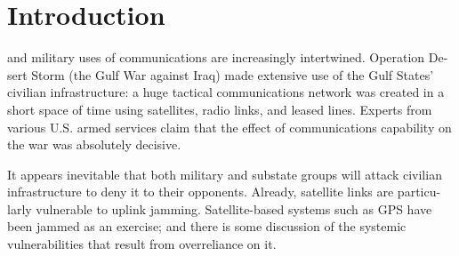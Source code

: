 \documentclass[10pt,journal,compsoc]{IEEEtran}
\begin{document}
\ifCLASSOPTIONcompsoc
{}
\else
\section{Introduction}
\label{sec:introduction}
\fi




%
%
%
%
 and military uses of communications are increasingly intertwined. Operation De-
sert Storm (the Gulf War against Iraq) made extensive use of the Gulf States’ civilian
infrastructure: a huge tactical communications network was created in a short space of
time using satellites, radio links, and leased lines. Experts from various U.S. armed
services claim that the effect of communications capability on the war was absolutely
decisive.

It appears inevitable that both military and substate groups will attack
civilian infrastructure to deny it to their opponents. Already, satellite links are particu-
larly vulnerable to uplink jamming. Satellite-based systems such as GPS have been
jammed as an exercise; and there is some discussion of the systemic vulnerabilities that
result from overreliance on it.
\end{document}
